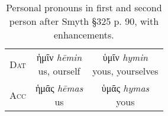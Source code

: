 \documentclass[10pt]{memoir}
\newcommand{\tsc}[1]{\textsc{#1}}
\newcommand{\grc}[1]{\fontspec{Inter}#1}
\newcommand{\trc}[1]{\textit{\fontspec{Tinos}#1}}
\begin{document}
\begin{table}[H]
\begin{tabular}{c|cc}
            \tsc{Dat} & \makecell{\grc{ἡμῖν} \trc{hēmin} \\ \small us, ourself} & \makecell{\grc{ὑμῖν} \trc{hymin} \\ \small yous, yourselves} \\
            \tsc{Acc} & \makecell{\grc{ἡμᾶς} \trc{hēmas} \\ \small us} & \makecell{ \grc{ὑμᾶς} \trc{hymas} \\ \small yous} \\
        \end{tabular}
        \caption{Personal pronouns in first and second person after Smyth §325 p. 90, with enhancements.}
    \end{table}
\end{document}
